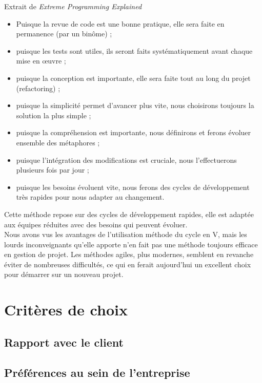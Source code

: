 Extrait de \textit{Extreme Programming Explained}
\begin{Quote}
\begin{itemize}
\item Puisque la revue de code est une bonne pratique, elle sera faite en permanence (par un binôme) ;
\item puisque les tests sont utiles, ils seront faits systématiquement avant chaque mise en œuvre ;
\item puisque la conception est importante, elle sera faite tout au long du projet (refactoring) ;
\item puisque la simplicité permet d'avancer plus vite, nous choisirons toujours la solution la plus simple ;
\item puisque la compréhension est importante, nous définirons et ferons évoluer ensemble des métaphores ;
\item puisque l'intégration des modifications est cruciale, nous l'effectuerons plusieurs fois par jour ;
\item puisque les besoins évoluent vite, nous ferons des cycles de développement très rapides pour nous adapter au changement.
\end{itemize}
\end{Quote}

Cette méthode repose sur des cycles de développement rapides, elle est adaptée aux équipes réduites avec des besoins qui peuvent évoluer.
\\
Nous avons vus les avantages de l'utilisation méthode du cycle en V, mais les lourds inconveignants qu'elle apporte n'en fait pas une méthode toujours efficace en gestion de projet. Les méthodes agiles, plus modernes, semblent en revanche éviter de nombreuses difficultés, ce qui en ferait aujourd'hui un excellent choix pour démarrer sur un nouveau projet.

\section{Critères de choix}

\subsection{Rapport avec le client}

\subsection{Préférences au sein de l'entreprise}

